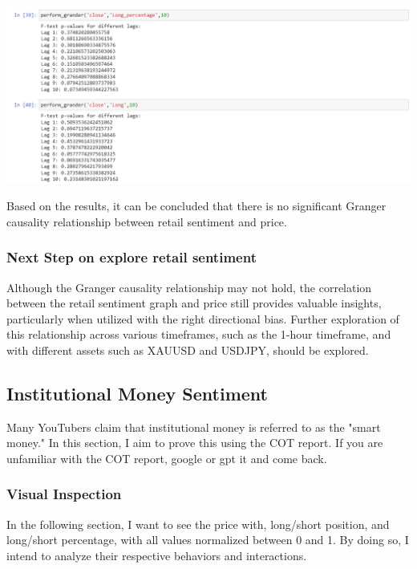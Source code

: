 \documentclass{article}
\begin{document}
\begin{center}
    \includegraphics[scale=0.7]{p7.png}    
\end{center}
Based on the results, it can be concluded that there is no significant Granger causality relationship between retail sentiment and price. \\ 
\subsubsection{Next Step on explore retail sentiment}
Although the Granger causality relationship may not hold, the correlation between the retail sentiment graph and price still provides valuable insights, particularly when utilized with the right directional bias. Further exploration of this relationship across various timeframes, such as the 1-hour timeframe, and with different assets such as XAUUSD and USDJPY, should be explored. 

\subsection{Institutional Money Sentiment}
Many YouTubers claim that institutional money is referred to as the "smart money." In this section, I aim to prove this using the COT report. If you are unfamiliar with the COT report, google or gpt it and come back.

\subsubsection{Visual Inspection}
In the following section, I want to see the price with, long/short position, and long/short percentage, with all values normalized between 0 and 1. By doing so, I intend to analyze their respective behaviors and interactions. \\
\end{document}
